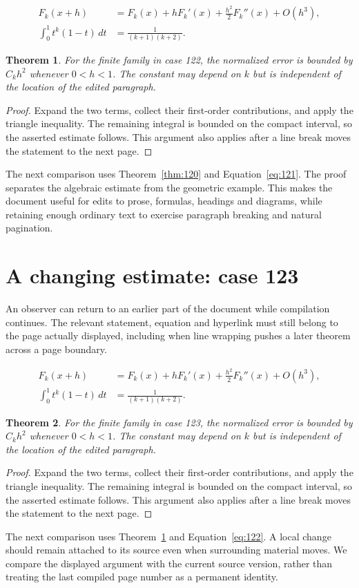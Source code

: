 \documentclass[a4paper,10pt]{article}
\newtheorem{theorem}{Theorem}[section]
\begin{document}
\lipsum[4-5]
\begin{align}\label{eq:121}
 F_k(x+h)&=F_k(x)+hF_k'(x)+\frac{h^2}{2}F_k''(x)+O(h^3),\\
 \int_0^1 t^k(1-t)\,dt&=\frac{1}{(k+1)(k+2)}.
\end{align}
\begin{theorem}\label{thm:121}
For the finite family in case 122, the normalized error is bounded by $C_k h^2$ whenever $0<h<1$. The constant may depend on $k$ but is independent of the location of the edited paragraph.
\end{theorem}
\begin{proof}
Expand the two terms, collect their first-order contributions, and apply the
triangle inequality. The remaining integral is bounded on the compact interval,
so the asserted estimate follows. This argument also applies after a line break
moves the statement to the next page.
\end{proof}
The next comparison uses Theorem~\ref{thm:120} and Equation~\ref{eq:121}. The proof separates the algebraic estimate from the geometric example. This makes the document useful for edits to prose, formulas, headings and diagrams, while retaining enough ordinary text to exercise paragraph breaking and natural pagination.

\lipsum[8]

\section{A changing estimate: case 123}\label{unit:122}
An observer can return to an earlier part of the document while compilation continues. The relevant statement, equation and hyperlink must still belong to the page actually displayed, including when line wrapping pushes a later theorem across a page boundary.

\lipsum[7-8]
\begin{align}\label{eq:122}
 F_k(x+h)&=F_k(x)+hF_k'(x)+\frac{h^2}{2}F_k''(x)+O(h^3),\\
 \int_0^1 t^k(1-t)\,dt&=\frac{1}{(k+1)(k+2)}.
\end{align}
\begin{theorem}\label{thm:122}
For the finite family in case 123, the normalized error is bounded by $C_k h^2$ whenever $0<h<1$. The constant may depend on $k$ but is independent of the location of the edited paragraph.
\end{theorem}
\begin{proof}
Expand the two terms, collect their first-order contributions, and apply the
triangle inequality. The remaining integral is bounded on the compact interval,
so the asserted estimate follows. This argument also applies after a line break
moves the statement to the next page.
\end{proof}
The next comparison uses Theorem~\ref{thm:121} and Equation~\ref{eq:122}. A local change should remain attached to its source even when surrounding material moves. We compare the displayed argument with the current source version, rather than treating the last compiled page number as a permanent identity.
\end{document}
